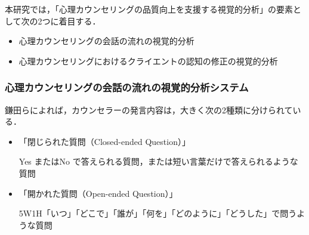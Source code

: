 \documentclass[shuuron]{kuee}
\begin{document}
%



本研究では，「心理カウンセリングの品質向上を支援する視覚的分析」の要素として次の2つに着目する．
\begin{itemize}
  \item %
  心理カウンセリングの会話の流れの視覚的分析%
  \item 心理カウンセリングにおけるクライエントの認知の修正の視覚的分析
\end{itemize}



\subsubsection{心理カウンセリングの会話の流れの視覚的分析システム}


鎌田ら\cite{Darshana}によれば，カウンセラーの発言内容は，大きく次の2種類に分けられている．%
\begin{itemize}
  \item 「閉じられた質問（Closed-ended Question）」

  Yes またはNo で答えられる質問，または短い言葉だけで答えられるような質問
  \item 「開かれた質問（Open-ended Question）」

  5W1H「いつ」「どこで」「誰が」「何を」「どのように」「どうした」で問うような質問

\end{itemize}
\end{document}
